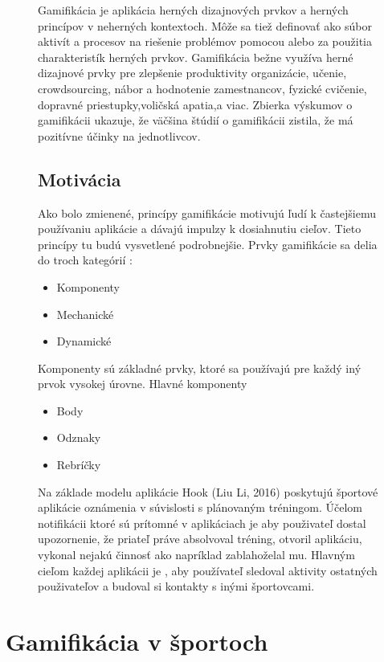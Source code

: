\documentclass[10pt,twoside,slovak,a4paper]{article}
\begin{document}
\begin{figure}[tbh]
Gamifikácia je aplikácia herných dizajnových prvkov a herných princípov v neherných kontextoch. Môže sa tiež definovať ako súbor aktivít a procesov na riešenie problémov pomocou alebo za použitia charakteristík herných prvkov. Gamifikácia bežne využíva herné dizajnové
prvky pre zlepšenie produktivity organizácie, učenie, crowdsourcing, nábor a hodnotenie zamestnancov, fyzické cvičenie, dopravné priestupky,voličská apatia,a viac. Zbierka výskumov o gamifikácii ukazuje, že väčšina štúdií o gamifikácii zistila, že má pozitívne účinky na jednotlivcov.\cite{Gamification-Framework}


\subsection{Motivácia} 

Ako bolo zmienené, princípy gamifikácie motivujú ľudí k častejšiemu používaniu aplikácie a dávajú impulzy k dosiahnutiu cieľov. Tieto princípy tu budú vysvetlené podrobnejšie. 
\label{prvky} Prvky gamifikácie sa delia do troch kategórií :
\begin{itemize}
  \item {Komponenty}
  \item {Mechanické}
  \item {Dynamické}
\end{itemize}
Komponenty sú základné prvky, ktoré sa používajú pre každý iný prvok vysokej úrovne. Hlavné komponenty
\begin{itemize}
  \item {Body}
  \item {Odznaky}
  \item {Rebríčky}
\end{itemize}

    
Na základe modelu aplikácie Hook (Liu Li, 2016) \cite{Improving_motivation-Framework} poskytujú športové aplikácie oznámenia v súvislosti s plánovaným tréningom. Účelom notifikácii ktoré sú prítomné v aplikáciach je aby použivateľ dostal  upozornenie, že priateľ práve absolvoval tréning, otvoril aplikáciu, vykonal nejakú činnosť ako napríklad zablahoželal mu. Hlavným cieľom každej aplikácii je , aby používateľ sledoval aktivity ostatných použivateľov a budoval si kontakty s inými športovcami.

\end{figure}
\newpage
\section{Gamifikácia v športoch} \label{gamifikacia v športoch}
\end{document}
